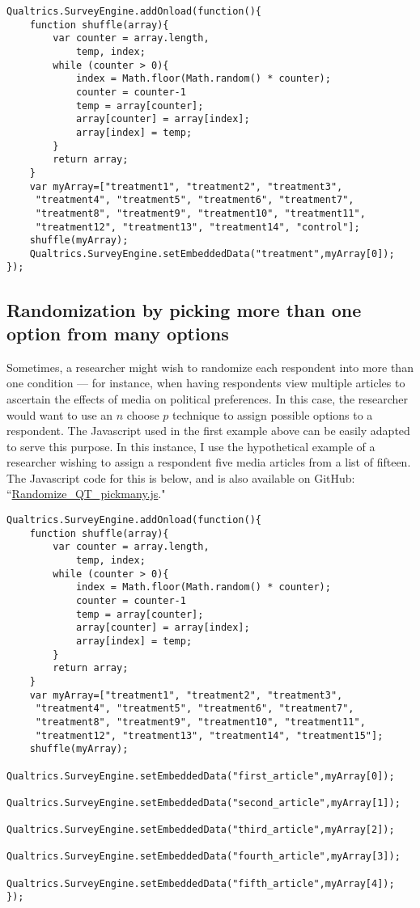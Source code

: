 \documentclass[12pt]{article}
\begin{document}
\begin{verbatim}
Qualtrics.SurveyEngine.addOnload(function(){
	function shuffle(array){
		var counter = array.length,
			temp, index;
		while (counter > 0){
			index = Math.floor(Math.random() * counter);
			counter = counter-1
			temp = array[counter];
			array[counter] = array[index];
			array[index] = temp;
		}
		return array;
	}
	var myArray=["treatment1", "treatment2", "treatment3",
	 "treatment4", "treatment5", "treatment6", "treatment7", 
	 "treatment8", "treatment9", "treatment10", "treatment11", 
	 "treatment12", "treatment13", "treatment14", "control"];
	shuffle(myArray);
	Qualtrics.SurveyEngine.setEmbeddedData("treatment",myArray[0]);
});
\end{verbatim}

\subsection{Randomization by picking more than one option from many options}
Sometimes, a researcher might wish to randomize each respondent into more than one condition --- for instance, when having respondents view multiple articles to ascertain the effects of media on political preferences. In this case, the researcher would want to use an $n$ choose $p$ technique to assign possible options to a respondent. The Javascript used in the first example above can be easily adapted to serve this purpose. In this instance, I use the hypothetical example of a researcher wishing to assign a respondent five media articles from a list of fifteen. The Javascript code for this is below, and is also available on GitHub: ``\href{https://github.com/justindbk/qualtrics-javascript}{Randomize\_QT\_pickmany.js}."

\begin{verbatim}
Qualtrics.SurveyEngine.addOnload(function(){
	function shuffle(array){
		var counter = array.length,
			temp, index;
		while (counter > 0){
			index = Math.floor(Math.random() * counter);
			counter = counter-1
			temp = array[counter];
			array[counter] = array[index];
			array[index] = temp;
		}
		return array;
	}
	var myArray=["treatment1", "treatment2", "treatment3",
	 "treatment4", "treatment5", "treatment6", "treatment7", 
	 "treatment8", "treatment9", "treatment10", "treatment11", 
	 "treatment12", "treatment13", "treatment14", "treatment15"];
	shuffle(myArray);
	Qualtrics.SurveyEngine.setEmbeddedData("first_article",myArray[0]);
	Qualtrics.SurveyEngine.setEmbeddedData("second_article",myArray[1]);
	Qualtrics.SurveyEngine.setEmbeddedData("third_article",myArray[2]);
	Qualtrics.SurveyEngine.setEmbeddedData("fourth_article",myArray[3]);
	Qualtrics.SurveyEngine.setEmbeddedData("fifth_article",myArray[4]);
});
\end{verbatim}
\end{document}
